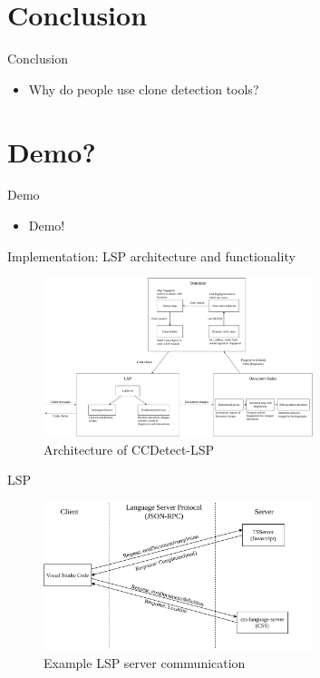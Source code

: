 \documentclass[aspectratio=1610, xcolor=table]{beamer}
\begin{document}
\section{Conclusion}
\begin{frame}{Conclusion}
	\begin{itemize}
		\item Why do people use clone detection tools?
	\end{itemize}
\end{frame}

\section{Demo?}

\begin{frame}{Demo}
    \begin{itemize}
        \item Demo!
    \end{itemize}
\end{frame}

\begin{frame}{Implementation: LSP architecture and functionality}
    \begin{figure}
        \begin{center}
            \includegraphics[width=0.7\textwidth]{figures/architecture.drawio.pdf}
        \end{center}
        \caption{Architecture of CCDetect-LSP}
    \end{figure}
\end{frame}

\begin{frame}{LSP}
    \begin{figure}
        \begin{center}
            \includegraphics[width=0.7\textwidth]{figures/lspcommunication.drawio.pdf}
        \end{center}
        \caption{Example LSP server communication}
    \end{figure}
\end{frame}
\end{document}
